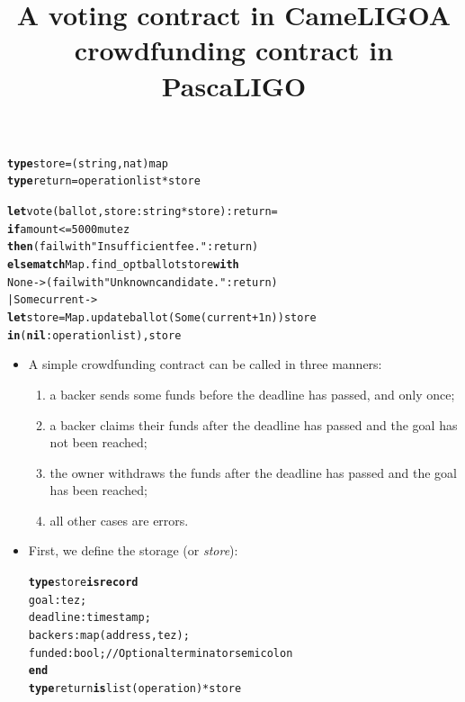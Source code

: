 \documentclass[wide]{slides}
\begin{document}
\begin{slide}
  \title{A voting contract in CameLIGO}

  \begin{alltt}
\textbf{type} store = (string, nat) map
\textbf{type} return = operation list * store

\textbf{let} vote (ballot, store : string * store) : return =
  \textbf{if}   amount <= 5000mutez
  \textbf{then} (failwith "Insufficient fee." : return)
  \textbf{else match} Map.find\_opt ballot store \textbf{with}
           None -> (failwith "Unknown candidate." : return)
        | Some current ->
             \textbf{let} store = Map.update ballot (Some (current + 1n)) store
             \textbf{in} (\textbf{nil} : operation list), store
  \end{alltt}

\end{slide}

\begin{slide}
  \title{A crowdfunding contract in PascaLIGO}

  \begin{itemize}

    \item A simple crowdfunding contract can be called in three
      manners:
      \begin{enumerate}

        \item a backer sends some funds before the deadline has
          passed, and only once;

        \item a backer claims their funds after the deadline has
          passed and the goal has not been reached;

        \item the owner withdraws the funds after the deadline has
          passed and the goal has been reached;

        \item all other cases are errors.

      \end{enumerate}

      \item First, we define the storage (or \emph{store}):
  \begin{alltt}
\textbf{type} store \textbf{is} \textbf{record}
    goal      : tez;
    deadline : timestamp;
    backers  : map (address, tez);
    funded   : bool;                  // Optional terminator semicolon
  \textbf{end}
\textbf{type} return \textbf{is} list (operation) * store
  \end{alltt}

  \end{itemize}

\end{slide}
\end{document}
